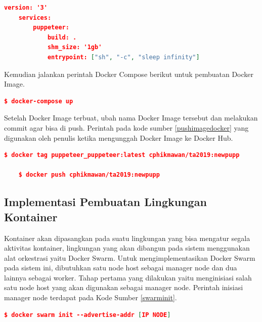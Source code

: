 				\begin{lstlisting}[frame=single,tabsize=2,breaklines,caption={Konfigurasi docker-compose.yml },label=dockercompose, captionpos=b, language=json]
	version: '3'
	services:
		puppeteer:
			build: .
			shm_size: '1gb'
			entrypoint: ["sh", "-c", "sleep infinity"]
				\end{lstlisting}
				
				Kemudian jalankan perintah Docker Compose berikut untuk pembuatan Docker Image.
				\begin{lstlisting}[frame=single,tabsize=2,breaklines,caption={Perintah untuk menjalankan  Docker Compose},label=createimg, captionpos=b, language=json,numbers=none]
	$ docker-compose up
				\end{lstlisting}
				
				Setelah Docker Image terbuat, ubah nama Docker Image tersebut dan melakukan commit agar bisa di push. Perintah pada kode sumber \ref{pushimagedocker} yang digunakan oleh penulis ketika mengunggah Docker Image ke Docker Hub.
				\begin{lstlisting}[frame=single,tabsize=2,breaklines,caption={Perintah untuk mengunggah Docker Image},label=pushimagedocker, captionpos=b, language=json,numbers=none]
	$ docker tag puppeteer_puppeteer:latest cphikmawan/ta2019:newpupp
	
	$ docker push cphikmawan/ta2019:newpupp
				\end{lstlisting}
				
		\subsection{Implementasi Pembuatan Lingkungan Kontainer}
			Kontainer akan dipasangkan pada suatu lingkungan yang bisa mengatur segala aktivitas kontainer, lingkungan yang akan dibangun pada sistem menggunakan alat orkestrasi yaitu Docker Swarm. Untuk mengimplementasikan Docker Swarm pada sistem ini, dibutuhkan satu node host sebagai manager node dan dua lainnya sebagai worker. Tahap pertama yang dilakukan yaitu menginisiasi salah satu node host yang akan digunakan sebagai manager node. Perintah inisiasi manager node terdapat pada Kode Sumber \ref{swarminit}.
			\begin{lstlisting}[frame=single,tabsize=2,breaklines,caption={Perintah untuk inisiasi manager node},label=swarminit, captionpos=b, language=json,numbers=none]
	$ docker swarm init --advertise-addr [IP NODE]
			\end{lstlisting}
			
